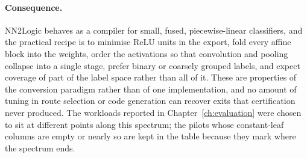 \paragraph{Consequence.}
NN2Logic behaves as a compiler for small, fused, piecewise-linear classifiers, and the practical recipe is to minimise ReLU units in the export, fold every affine block into the weights, order the activations so that convolution and pooling collapse into a single stage, prefer binary or coarsely grouped labels, and expect coverage of part of the label space rather than all of it.
These are properties of the conversion paradigm rather than of one implementation, and no amount of tuning in route selection or code generation can recover exits that certification never produced.
The workloads reported in Chapter~\ref{ch:evaluation} were chosen to sit at different points along this spectrum; the pilots whose constant-leaf columns are empty or nearly so are kept in the table because they mark where the spectrum ends.

